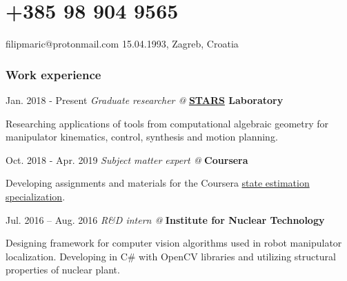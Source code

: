 \documentclass{tccv}
\begin{document}
\part
    [hr.linkedin.com/in/filipmrc]
    {+385 98 904 9565}   
    {filipmaric@protonmail.com}
    {15.04.1993, Zagreb, Croatia} 
 
       
\section{Work experience} 
 
\begin{eventlist}
  
\item{Jan. 2018 - Present} 
     {\textit{Graduate researcher @} \textbf{\href{http://www.starslab.ca/}{STARS} Laboratory}}
     
     Researching applications of tools from computational algebraic geometry for manipulator kinematics, control, synthesis and motion planning. 

\item{Oct. 2018 - Apr. 2019} 
     {\textit{Subject matter expert @} \textbf{Coursera}}  

     Developing assignments and materials for the Coursera \href{https://www.coursera.org/learn/state-estimation-localization-self-driving-cars}{state estimation specialization}.

\item{Jul. 2016 -- Aug. 2016}    
     {\textit{R\&D intern @} \textbf{Institute for Nuclear Technology}}
     
Designing framework for computer vision algorithms used in robot manipulator localization. Developing in C\# with OpenCV libraries and utilizing structural properties of nuclear plant.
 
%       
\end{eventlist}
\end{document}
